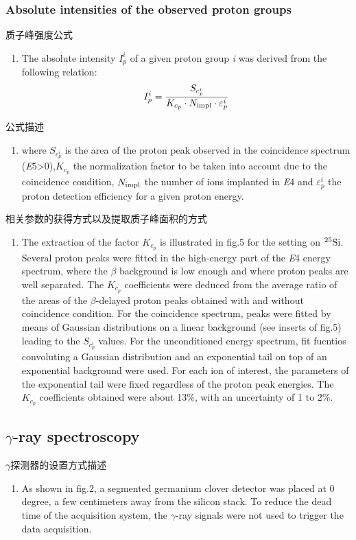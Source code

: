 \documentclass[UTF8]{ctexart}
\begin{document}
\subsubsection{Absolute intensities of the observed proton groups}
质子峰强度公式
\begin{enumerate}
    \item The absolute intensity $I_{p}^{i}$ of a given proton group \textit{i} was derived from the following relation:
    \begin{equation}
        I_{p}^{i}=\frac{S_{c_{p}^{i}}}{K_{c_{p}} \cdot N_{\textnormal{impl}}\cdot \varepsilon_{p}^{i}}
    \end{equation}
\end{enumerate}

公式描述
\begin{enumerate}
    \item where $S_{c_{p}^{i}}$ is the area of the proton peak observed in the coincidence spectrum (\textit{E}5>0),$K_{c_{p}}$ the normalization factor to be taken into account due to the coincidence condition, $N_{\textnormal{impl}}$ the number of ions implanted in \textit{E}4 and $\varepsilon_{p}^{i}$ the proton detection efficiency for a given proton energy.
\end{enumerate}

相关参数的获得方式以及提取质子峰面积的方式
\begin{enumerate}
    \item The extraction of the factor $K_{c_{p}}$ is illustrated in fig.5 for the setting on $^{25}\textnormal{Si}$. Several proton peaks were fitted in the high-energy part of the \textit{E}4 energy spectrum, where the $\beta$ background is low enough and where proton peaks are well separated. The $K_{c_{p}}$ coefficients were deduced from the average ratio of the areas of the $\beta$-delayed proton peaks obtained with and without coincidence condition. For the coincidence spectrum, peaks were fitted by means of Gaussian distributions on a linear background (see inserts of fig.5) leading to the $S_{c_{p}^{i}}$ values. For the unconditioned energy spectrum, fit fucntios convoluting a Gaussian distribution and an exponential tail on top of an exponential background were used. For each ion of interest, the parameters of the exponential tail were fixed regardless of the proton peak energies. The $K_{c_{p}}$ coefficients obtained were about 13\%, with an uncertainty of 1 to 2\%.
\end{enumerate}


\subsection{$\gamma$-ray spectroscopy}
$\gamma$探测器的设置方式描述
\begin{enumerate}
    \item As shown in fig.2, a segmented germanium clover detector was placed at 0 degree, a few centimeters away from the silicon stack. To reduce the dead time of the acquisition system, the $\gamma$-ray signals were not used to trigger the data acquisition. 
\end{enumerate}
\end{document}
